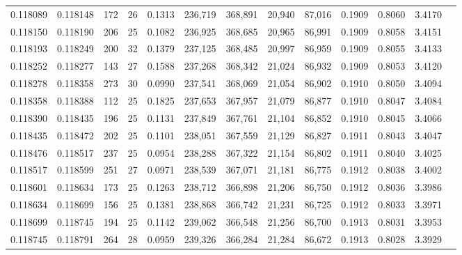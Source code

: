 \begin{tabular}{rrrrrrrrrrrrr}
0.118089 & 0.118148 & 172 &  26 &                                     0.1313 & 236,719 & 368,891 &  20,940 &  87,016 & 0.1909 & 0.8060 & 3.4170 \\
0.118150 & 0.118190 & 206 &  25 &                                     0.1082 & 236,925 & 368,685 &  20,965 &  86,991 & 0.1909 & 0.8058 & 3.4151 \\
0.118193 & 0.118249 & 200 &  32 &                                     0.1379 & 237,125 & 368,485 &  20,997 &  86,959 & 0.1909 & 0.8055 & 3.4133 \\
0.118252 & 0.118277 & 143 &  27 &                                     0.1588 & 237,268 & 368,342 &  21,024 &  86,932 & 0.1909 & 0.8053 & 3.4120 \\
0.118278 & 0.118358 & 273 &  30 &                                     0.0990 & 237,541 & 368,069 &  21,054 &  86,902 & 0.1910 & 0.8050 & 3.4094 \\
0.118358 & 0.118388 & 112 &  25 &                                     0.1825 & 237,653 & 367,957 &  21,079 &  86,877 & 0.1910 & 0.8047 & 3.4084 \\
0.118390 & 0.118435 & 196 &  25 &                                     0.1131 & 237,849 & 367,761 &  21,104 &  86,852 & 0.1910 & 0.8045 & 3.4066 \\
0.118435 & 0.118472 & 202 &  25 &                                     0.1101 & 238,051 & 367,559 &  21,129 &  86,827 & 0.1911 & 0.8043 & 3.4047 \\
0.118476 & 0.118517 & 237 &  25 &                                     0.0954 & 238,288 & 367,322 &  21,154 &  86,802 & 0.1911 & 0.8040 & 3.4025 \\
0.118517 & 0.118599 & 251 &  27 &                                     0.0971 & 238,539 & 367,071 &  21,181 &  86,775 & 0.1912 & 0.8038 & 3.4002 \\
0.118601 & 0.118634 & 173 &  25 &                                     0.1263 & 238,712 & 366,898 &  21,206 &  86,750 & 0.1912 & 0.8036 & 3.3986 \\
0.118634 & 0.118699 & 156 &  25 &                                     0.1381 & 238,868 & 366,742 &  21,231 &  86,725 & 0.1912 & 0.8033 & 3.3971 \\
0.118699 & 0.118745 & 194 &  25 &                                     0.1142 & 239,062 & 366,548 &  21,256 &  86,700 & 0.1913 & 0.8031 & 3.3953 \\
0.118745 & 0.118791 & 264 &  28 &                                     0.0959 & 239,326 & 366,284 &  21,284 &  86,672 & 0.1913 & 0.8028 & 3.3929 \\

\end{tabular}
